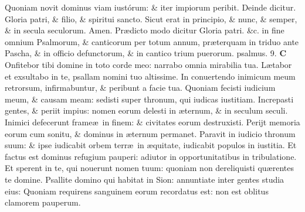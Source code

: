 \documentclass[a5paper,10pt]{book}
\def\ae{æ}
\begin{document}
\begin{multicols*}{2}
\newline \color{red} Q\color{black}uoniam novit dominus viam iustórum: \& iter impiorum peribit.
\color{red} \quad Deinde dicitur. \color{black}
\newline \color{red} G\color{black}loria patri, \& filio, \& spiritui sancto.
\newline \color{red} S\color{black}icut erat in principio, \& nunc, \& semper, \& in secula seculorum. Amen. %
\newline
\color{red} Pr\ae dicto modo dicitur \color{black} Gloria patri. \color{red} \&c. in fine omnium Psalmorum, \& canticorum per totum annum, pr\ae terquam in triduo ante Pascha, \& in officio defunctorum, \& in cantico trium puerorum. \quad psalmus. 9. \color{black}
\lettrine[lines=2]{\bfseries \color{red} C}{}
Onfitebor tibi domine in toto corde meo: narrabo omnia mirabilia tua.
\newline \color{red} L\color{black}\ae tabor et exsultabo in te, psallam nomini tuo altissime.
\newline \color{red} I\color{black}n conuertendo inimicum meum retrorsum, infirmabuntur, \& peribunt a facie tua.
\newline \color{red} Q\color{black}uoniam fecisti iudicium meum, \& causam meam: sedisti super thronum, qui iudicas iustitiam.
\newline \color{red} I\color{black}ncrepasti gentes, \& periit impius: nomen eorum delesti in \ae ternum, \& in seculum seculi.
\newline \color{red} I\color{black}nimici defecerunt frame\ae \ in finem: \& civitates eorum destruxisti.
\newline \color{red} P\color{black}erijt memoria eorum cum sonitu, \& dominus in \ae ternum permanet.
\newline \color{red} P\color{black}aravit in iudicio thronum suum: \& ipse iudicabit orbem terr\ae \ in \ae quitate, iudicabit populos in iustitia.
\newline \color{red} E\color{black}t factus est dominus refugium pauperi: adiutor in opportunitatibus in tribulatione.
\newline \color{red} E\color{black}t sperent in te, qui nouerunt nomen tuum: quoniam non dereliquisti qu\ae rentes te domine.
\newline \color{red} P\color{black}sallite domino qui habitat in Sion: annuntiate inter gentes studia eius:
\newline \color{red} Q\color{black}uoniam requirens sanguinem eorum recordatus est: non est oblitus clamorem pauperum.

\end{multicols*}
\end{document}
